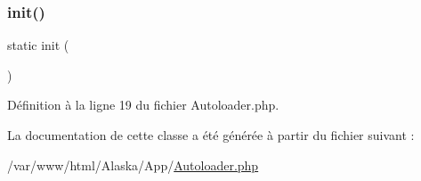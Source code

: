 \subsubsection{\texorpdfstring{init()}{init()}}
{\footnotesize\ttfamily static init (\begin{DoxyParamCaption}{ }\end{DoxyParamCaption})\hspace{0.3cm}{\ttfamily [static]}}



Définition à la ligne 19 du fichier Autoloader.\+php.



La documentation de cette classe a été générée à partir du fichier suivant \+:\begin{DoxyCompactItemize}
\item 
/var/www/html/\+Alaska/\+App/\hyperlink{_autoloader_8php}{Autoloader.\+php}\end{DoxyCompactItemize}
